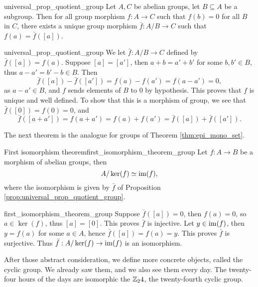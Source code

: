 \begin{cprop}{}{universal_prop_quotient_group}
    Let \( A, C \) be abelian groups, let \( B \subseteq A \) be a subgroup. Then for all group morphism \( f : A \to C \) such that \( f(b) = 0 \) for all \( B \) in \( C \), there exists a unique group morphism \( \bar f : A / B \to C \) such that \( f(a) = \bar f([a]) \). 
\end{cprop}
\begin{propproof}{universal_prop_quotient_group}
    We let \( \bar f : A / B \to C \) defined by \( \bar f ([a]) = f(a) \). Suppose \( [a] = [a'] \), then \( a + b = a' + b' \) for some \( b, b' \in B \), thus \( a - a' = b' - b \in B \). Then
    \begin{equation*}
        \bar f ([a]) - \bar f ([a']) = f(a) - f(a') = f(a - a') = 0,
    \end{equation*}
    as \( a - a' \in B \), and \( f \) sends elements of \( B \) to \( 0 \) by hypothesis. This proves that \( f \) is unique and well defined. To show that this is a morphism of group, we see that \( \bar f([0]) = f(0) = 0 \), and
    \begin{equation*}
        \bar f([a + a']) = f(a + a') = f(a) + f(a') = \bar f([a]) + \bar f([a']). 
    \end{equation*}
\end{propproof}

The next theorem is the analogue for groups of Theorem \ref{thm:epi_mono_set}.
\begin{cthm}{First isomorphism theorem}{first_isomorphism_theorem_group}
    Let \( f : A \to B \) be a morphism of abelian groups, then
    \begin{equation*}
        A / \ker(f) \simeq \operatorname{im}(f),
    \end{equation*}
    where the isomorphism is given by \( \bar f \) of Proposition \ref{prop:universal_prop_quotient_group}.
\end{cthm}
\begin{thmproof}{first_isomorphism_theorem_group}
    Suppose \( \bar f([a]) = 0 \), then \( f(a) = 0 \), so \( a \in \ker(f) \), thus \( [a] = [0] \). This proves \( \bar f \) is injective. Let \( y \in \operatorname{im}(f) \), then \( y = f(a) \) for some \( a \in A \), hence \( \bar f([a]) = f(a) = y \). This proves \( \bar f \) is surjective. Thus \( \bar f : A / \ker(f) \to \operatorname{im}(f) \) is an isomorphism. 
\end{thmproof}

After those abstract consideration, we define more concrete objects, called the cyclic group. We already saw them, and we also see them every day. The twenty-four hours of the days are isomorphic the \( \mathbb{Z}_24 \), the twenty-fourth cyclic group.

